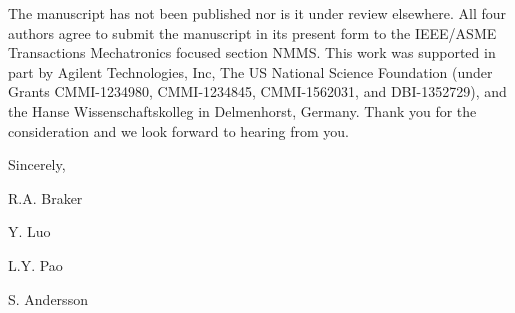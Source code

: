 \documentclass[a4paper,twoside]{article}
\begin{document}
The manuscript has not been published nor is it under review elsewhere. All four authors agree to submit the manuscript in its present form to the IEEE/ASME Transactions Mechatronics focused section NMMS. This work was supported in part by Agilent Technologies, Inc, The US National Science Foundation (under Grants CMMI-1234980, CMMI-1234845, CMMI-1562031, and DBI-1352729), and the Hanse Wissenschaftskolleg in Delmenhorst, Germany. Thank you for the consideration and we look forward to hearing from you.

\par\bigskip
\noindent Sincerely,
\par\bigskip
\noindent R.A. Braker\par
\noindent Y. Luo\par
\noindent L.Y. Pao\par
\noindent S. Andersson
\end{document}
